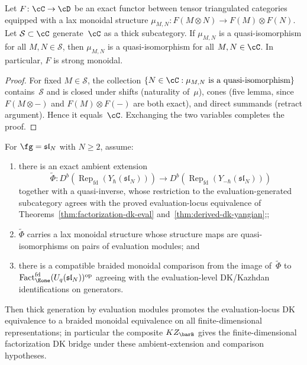\begin{lemma}
\label{lem:monoidal-thick-extension}
Let $F\colon \cC \to \cD$ be an exact functor between tensor
triangulated categories equipped with a lax monoidal structure
$\mu_{M,N}\colon F(M \otimes N) \to F(M) \otimes F(N)$.
Let $\mathcal{S} \subset \cC$ generate~$\cC$ as a thick subcategory.
If $\mu_{M,N}$ is a quasi-isomorphism for all $M, N \in \mathcal{S}$,
then $\mu_{M,N}$ is a quasi-isomorphism for all $M, N \in \cC$.
In particular, $F$ is strong monoidal.
\end{lemma}

\begin{proof}
For fixed $M \in \mathcal{S}$, the collection
$\{N \in \cC : \mu_{M,N} \text{ is a quasi-isomorphism}\}$
contains~$\mathcal{S}$ and is closed under shifts (naturality of~$\mu$),
cones (five lemma, since $F(M \otimes -)$ and
$F(M) \otimes F(-)$ are both exact), and direct summands
(retract argument). Hence it equals~$\cC$.
Exchanging the two variables completes the proof.
\end{proof}

\begin{conjecture}
\label{conj:dk-fd-typeA}
For $\fg = \mathfrak{sl}_N$ with $N \ge 2$, assume:
\begin{enumerate}[label=\textup{(\alph*)}]
\item there is an exact ambient extension
 \[
 \widetilde{\Phi}\colon
 D^b(\operatorname{Rep}_{\mathrm{fd}}(Y_\hbar(\mathfrak{sl}_N)))
 \to
 D^b(\operatorname{Rep}_{\mathrm{fd}}(Y_{-\hbar}(\mathfrak{sl}_N)))
 \]
 together with a quasi-inverse, whose restriction to the
 evaluation-generated subcategory agrees with the proved
 evaluation-locus equivalence of
 Theorems~\textup{\ref{thm:factorization-dk-eval}}
 and~\textup{\ref{thm:derived-dk-yangian}\textup{;}};
\item $\widetilde{\Phi}$ carries a lax monoidal structure whose
 structure maps are quasi-isomorphisms on pairs of evaluation
 modules; and
\item there is a compatible braided monoidal comparison from the image
 of~$\widetilde{\Phi}$ to
 $\operatorname{Fact}_{\Eone}^{\mathrm{fd}}(U_q(\mathfrak{sl}_N))^{\mathrm{op}}$
 agreeing with the evaluation-level DK/Kazhdan identifications on
 generators.
\end{enumerate}
Then thick generation by evaluation modules promotes the
evaluation-locus DK equivalence to a braided monoidal equivalence on
all finite-dimensional representations; in particular the composite
$KZ_{\barB}$ gives the finite-dimensional factorization DK bridge
under these ambient-extension and comparison hypotheses.
\end{conjecture}


